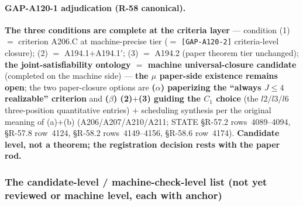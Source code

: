 \paragraph{GAP-A120-1 adjudication (R-58 canonical).} \textbf{The three
conditions are complete at the criteria layer} --- condition (1) $=$
criterion A206.C at machine-precise tier ($=$ \texttt{[GAP-A120-2]}
criteria-level closure); (2) $=$ A194.1$+$A194.1$'$; (3) $=$ A194.2 (paper
theorem tier unchanged); \textbf{the joint-satisfiability ontology $=$
machine universal-closure candidate} (completed on the machine side) ---
\textbf{the $\mu$ paper-side existence remains open}; the two paper-closure
options are \textbf{($\alpha$) paperizing the ``always $J\le4$ realizable''
criterion} and \textbf{($\beta$) (2)$+$(3) guiding the $C_1$ choice} (the
$l2/l3/l6$ three-position quantitative entries) $+$ scheduling synthesis per
the original meaning of (a)$+$(b) (A206/A207/A210/A211; STATE \S R-57.2
rows~4089--4094, \S R-57.8 row~4124, \S R-58.2 rows~4149--4156, \S R-58.6
row~4174). \textbf{Candidate level, not a theorem; the registration
decision rests with the paper rod.}

\subsubsection{The candidate-level / machine-check-level list (not yet
reviewed or machine level, each with anchor) \tierMCA}\label{subsec:add-candlist}

